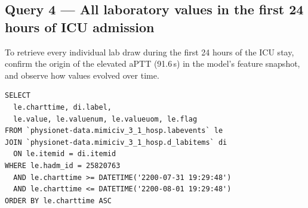 \documentclass[12pt, a4paper]{article}
\begin{document}
\subsection*{Query 4 --- All laboratory values in the first 24 hours of ICU admission}

To retrieve every individual lab draw during the first 24 hours of the ICU
stay, confirm the origin of the elevated aPTT (91.6\,s) in the model's
feature snapshot, and observe how values evolved over time.

\begin{lstlisting}[style=sql]
SELECT
  le.charttime, di.label,
  le.value, le.valuenum, le.valueuom, le.flag
FROM `physionet-data.mimiciv_3_1_hosp.labevents` le
JOIN `physionet-data.mimiciv_3_1_hosp.d_labitems` di
  ON le.itemid = di.itemid
WHERE le.hadm_id = 25820763
  AND le.charttime >= DATETIME('2200-07-31 19:29:48')
  AND le.charttime <= DATETIME('2200-08-01 19:29:48')
ORDER BY le.charttime ASC
\end{lstlisting}
\end{document}
